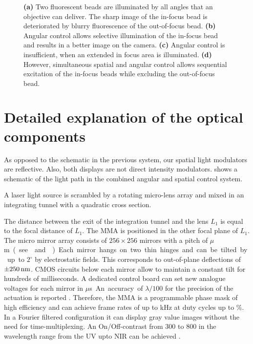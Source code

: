 \begin{figure}[!hbt]
  \centering
  \def\svgscale{.43}
  
  \caption{{\bf (a)} Two fluorescent beads are illuminated by all
    angles that an objective can deliver. The sharp image of the
    in-focus bead is deteriorated by blurry fluorescence of the
    out-of-focus bead. {\bf (b)} Angular control allows selective
    illumination of the in-focus bead and results in a better image on
    the camera. {\bf (c)} Angular control is insufficient, when an
    extended in focus area is illuminated. {\bf (d)} However,
    simultaneous spatial and angular control allows sequential
    excitation of the in-focus beads while excluding the out-of-focus
    bead.}
  \label{fig:hourglass-all}
\end{figure}

\section{Detailed explanation of the optical components}

As opposed to the schematic in the previous system, our spatial light
modulators are reflective.  Also, both displays are not direct
intensity modulators.   shows a schematic of the
light path in the combined angular and spatial control system.

A laser light source is scrambled by a rotating micro-lens array and
mixed in an integrating tunnel with a quadratic cross section.

The distance between the exit of the integration tunnel and the lens
$L_1$ is equal to the focal distance of $L_1$. The MMA is positioned
in the other focal plane of $L_1$. The micro mirror array
\citep{Berndt2007,Schmidt2010,Berndt2010} consists of $256\times 256$
mirrors with a pitch of \unit[16]{$\mu$m} (see  and
). Each mirror hangs on two thin hinges and
can be tilted by up to $2^\circ$ by electrostatic fields. This
corresponds to out-of-plane deflections of $\pm\unit[250]{nm}$.  CMOS
circuits below each mirror allow to maintain a constant tilt for
hundreds of milliseconds. A dedicated control board can set new
analogue voltages for each mirror in \unit[850]{$\mu$s}. An accuracy
of $\lambda/100$ for the precision of the actuation is reported
\citep{Berndt2011}. Therefore, the MMA is a programmable phase mask of
high efficiency and can achieve frame rates of up to \unit[1]{kHz} at
duty cycles up to \unit[50]{\%}. In a Fourier filtered configuration
it can display gray value images without the need for
time-multiplexing.  An On/Off-contrast from 300 to 800 in the
wavelength range from the UV upto NIR can be achieved
\citep{Berndt2011}.

